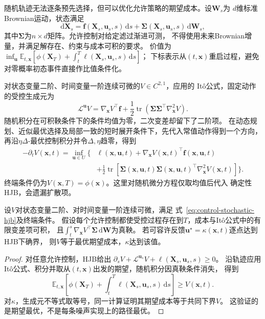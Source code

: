 随机轨迹无法逐条预先选择，但可以优化允许策略的期望成本。设$\bm W_s$为
$d$维标准Brownian运动，状态满足
\begin{equation}
  \mathrm d\bm X_s=\bm f(\bm X_s,\bm u_s,s)\,\mathrm ds
    +\bm\Sigma(\bm X_s,\bm u_s,s)\,\mathrm d\bm W_s,
  \label{eq:control-stochastic-dynamics}
\end{equation}
其中$\bm\Sigma$为$n\times d$矩阵。允许控制对给定滤过渐进可测，
不得使用未来Brownian增量，并满足解存在、约束与成本可积的要求。
价值为
$\inf_{\bm u}\mathbb E_{t,\bm x}[
\phi(\bm X_T)+\int_t^T\ell(\bm X_s,\bm u_s,s)\,\mathrm ds]$；
下标表示从$(t,\bm x)$重启过程，避免对零概率初态事件直接作比值条件化。

对状态变量二阶、时间变量一阶连续可微的$V\in C^{2,1}$，应用的
Itô公式，固定动作的受控生成元为
\[
  \mathcal L^{\bm u}V=
  \nabla_{\bm x}V^\top\bm f+
  \frac12\operatorname{tr}
    (\bm\Sigma\bm\Sigma^\top\nabla_{\bm x}^2V).
\]
随机积分在可积鞅条件下的条件均值为零，二次变差却留下了二阶项。
在动态规划、近似最优选择及局部一致的短时展开条件下，先代入常值动作得到一个方向，
再沿$\eta\Delta$-最优控制积分并令$\Delta,\eta$趋零，得到
\begin{equation}
  \begin{aligned}
  -\partial_tV(\bm x,t)=\inf_{\bm u\in U}\biggl\{&
    \ell(\bm x,\bm u,t)+
    \nabla_{\bm x}V(\bm x,t)^\top\bm f(\bm x,\bm u,t)\\
    &+\frac12\operatorname{tr}\!\left[
      \bm\Sigma(\bm x,\bm u,t)\bm\Sigma(\bm x,\bm u,t)^\top
      \nabla_{\bm x}^2V(\bm x,t)\right]\biggr\}.
  \end{aligned}
  \label{eq:control-stochastic-hjb}
\end{equation}
终端条件仍为$V(\bm x,T)=\phi(\bm x)$。这里对随机微分方程仅取均值后代入
确定性HJB，会遗漏扩散项。

\begin{theorem}[随机HJB验证]
\label{thm:control-stochastic-hjb-verification}
设$V$对状态变量二阶、对时间变量一阶连续可微，满足
式~\eqref{eq:control-stochastic-hjb}及终端条件。
假设每个允许控制都使受控过程存在到$T$，成本与Itô公式中的有限变差项可积，
且$\int_t^s\nabla_{\bm x}V^\top\bm\Sigma\,\mathrm d\bm W$为真鞅。
若可容许反馈$\bm u^\star=\kappa(\bm x,t)$逐点达到HJB下确界，
则$V$等于最优期望成本，$\kappa$达到该值。
\end{theorem}
\begin{proof}
对任意允许控制，HJB给出
$\partial_sV+\mathcal L^{\bm u_s}V+\ell(\bm X_s,\bm u_s,s)\geq0$。
沿轨迹应用Itô公式、积分并取从$(t,\bm x)$出发的期望，随机积分因真鞅条件消失，
得到
\[
  \mathbb E_{t,\bm x}\left[
    \phi(\bm X_T)+\int_t^T\ell(\bm X_s,\bm u_s,s)\,\mathrm ds\right]
  \geq V(\bm x,t).
\]
对$\kappa$，生成元不等式取等号，同一计算证明其期望成本等于共同下界$V$。
这验证的是期望最优，不是每条噪声实现上的路径最优。
\end{proof}

